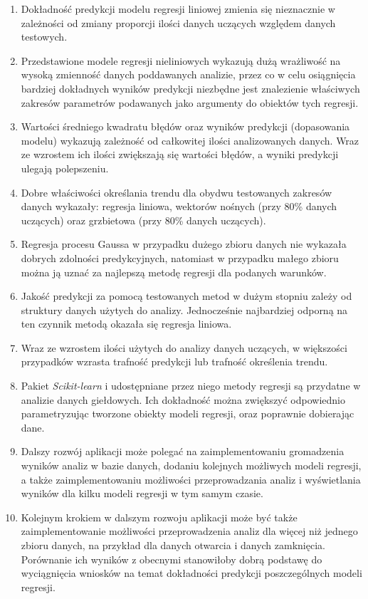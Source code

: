 \begin{enumerate}
 \item Dokładność predykcji modelu regresji liniowej zmienia się nieznacznie w zależności od zmiany proporcji ilości danych uczących względem danych testowych.\\
 \item Przedstawione modele regresji nieliniowych wykazują dużą wrażliwość na wysoką zmienność danych poddawanych analizie, przez co w celu osiągnięcia bardziej dokładnych wyników predykcji niezbędne jest znalezienie właściwych zakresów parametrów podawanych jako argumenty do obiektów tych regresji.\\
 \item Wartości średniego kwadratu błędów oraz wyników predykcji (dopasowania modelu) wykazują zależność od całkowitej ilości analizowanych danych. Wraz ze wzrostem ich ilości zwiększają się wartości błędów, a wyniki predykcji ulegają polepszeniu.\\
 \item Dobre właściwości określania trendu dla obydwu testowanych zakresów danych wykazały: regresja liniowa, wektorów nośnych (przy 80\% danych uczących) oraz grzbietowa (przy 80\% danych uczących).\\
 \item Regresja procesu Gaussa w przypadku dużego zbioru danych nie wykazała dobrych zdolności predykcyjnych, natomiast w przypadku małego zbioru można ją uznać za najlepszą metodę regresji dla podanych warunków.\\
 \item Jakość predykcji za pomocą testowanych metod w dużym stopniu zależy od struktury danych użytych do analizy. Jednocześnie najbardziej odporną na ten czynnik metodą okazała się regresja liniowa.\\
 \item Wraz ze wzrostem ilości użytych do analizy danych uczących, w większości przypadków wzrasta trafność predykcji lub trafność określenia trendu.\\
 \item Pakiet \textit{Scikit-learn} i udostępniane przez niego metody regresji są przydatne w analizie danych giełdowych. Ich dokładność można zwiększyć odpowiednio parametryzując tworzone obiekty modeli regresji, oraz poprawnie dobierając dane.\\
 \item Dalszy rozwój aplikacji może polegać na zaimplementowaniu gromadzenia wyników analiz w bazie danych, dodaniu kolejnych możliwych modeli regresji, a także zaimplementowaniu możliwości przeprowadzania analiz i wyświetlania wyników dla kilku modeli regresji w tym samym czasie.\\
 \item Kolejnym krokiem w dalszym rozwoju aplikacji może być także zaimplementowanie możliwości przeprowadzenia analiz dla więcej niż jednego zbioru danych, na przykład dla danych otwarcia i danych zamknięcia. Porównanie ich wyników z obecnymi stanowiłoby dobrą podstawę do wyciągnięcia wniosków na temat dokładności predykcji poszczególnych modeli regresji.
\end{enumerate}

